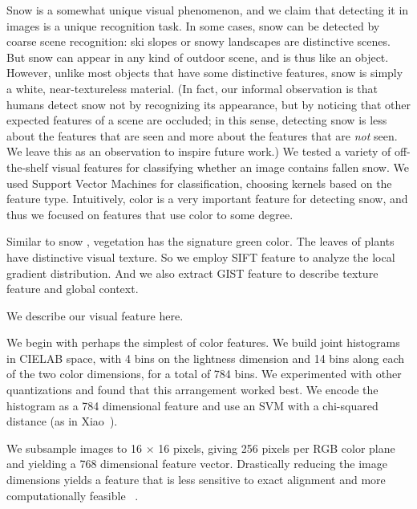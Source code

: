 Snow is a somewhat unique visual phenomenon, and we claim that
detecting it in images is a unique recognition task. In some cases,
snow can be detected by coarse scene recognition: ski slopes or snowy
landscapes are distinctive scenes. But snow can appear in any kind of
outdoor scene, and is thus like an object. However, unlike most
objects that have some distinctive features, snow is simply a white,
near-textureless material.  (In fact, our informal observation is that
humans detect snow not by recognizing its appearance, but by noticing
that other expected features of a scene are occluded; in this sense,
detecting snow is less about the features that are seen and more about
the features that are \textit{not} seen. We leave this as an
observation to inspire future work.)
%
We tested a variety of off-the-shelf visual features for classifying
whether an image contains fallen snow. We used Support Vector
Machines for classification, choosing kernels based on the feature
type.  Intuitively, color is a very important feature for detecting
snow, and thus we focused on features that use color to some
degree.  

Similar to snow , vegetation  has the signature green color. 
The leaves of plants have distinctive visual texture. 
So we employ SIFT feature to analyze the local gradient distribution. 
And we also extract GIST feature to describe texture feature and global context. 

We describe our visual feature here.


 We begin with perhaps the simplest of color
features. We build joint histograms in CIELAB space, with 4 bins on
the lightness dimension and 14 bins along each of the two color
dimensions, for a total of 784 bins. We experimented with other
quantizations and found that this arrangement worked best.  We encode
the histogram as a 784 dimensional feature and use an SVM with a
chi-squared distance (as in Xiao\etal~\cite{XiaoHEOT10}).

We subsample images to 16 $\times$ 16 pixels, giving 256 pixels per
RGB color plane and yielding a 768 dimensional feature vector.
Drastically reducing the image dimensions yields a feature that is
less sensitive to exact alignment and more computationally
feasible ~\cite{torralba2008tiny}.  


